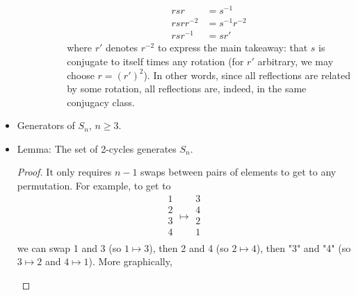 \documentclass[../notes.tex]{subfiles}
\begin{document}
\begin{itemize}
\begin{itemize}
\begin{itemize}
\begin{itemize}
\begin{align*}
                    rsr &= s^{-1}\\
                    rsrr^{-2} &= s^{-1}r^{-2}\\
                    rsr^{-1} &= sr'
                \end{align*}
                where $r'$ denotes $r^{-2}$ to express the main takeaway: that $s$ is conjugate to itself times any rotation (for $r'$ arbitrary, we may choose $r=(r')^2$). In other words, since all reflections are related by some rotation, all reflections are, indeed, in the same conjugacy class.
            \end{itemize}
        \end{itemize}
    \end{itemize}
    \item Generators of $S_n$, $n\geq 3$.
    \item Lemma: The set of 2-cycles generates $S_n$.
    \begin{proof}
        It only requires $n-1$ swaps between pairs of elements to get to any permutation. For example, to get to
        \begin{equation*}
            \begin{matrix}
                1\\
                2\\
                3\\
                4\\
            \end{matrix}
            \mapsto
            \begin{matrix}
                3\\
                4\\
                2\\
                1\\
            \end{matrix}
        \end{equation*}
        we can swap 1 and 3 (so $1\mapsto 3$), then 2 and 4 (so $2\mapsto 4$), then "3" and "4" (so $3\mapsto 2$ and $4\mapsto 1$). More graphically,
        \begin{figure}[H]
            \centering
\end{figure}
\end{proof}
\end{itemize}
\end{document}
